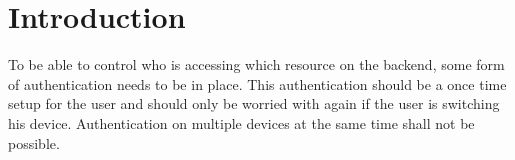 \section{Introduction} %

\label{Introduction} %

To be able to control who is accessing which resource on the backend, some form of authentication needs to be in place. This authentication should be a once time setup for the user and should only be worried with again if the user is switching his device. Authentication on multiple devices at the same time shall not be possible.